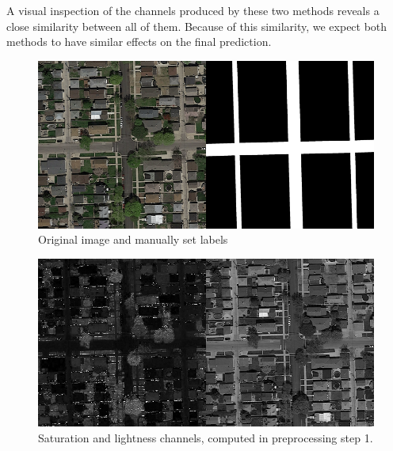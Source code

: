 \documentclass[10pt,conference,compsocconf]{IEEEtran}
\begin{document}
A visual inspection of the channels produced by these two methods reveals a close similarity between all of them.
Because of this similarity, we expect both methods to have similar effects on the final prediction.

\begin{figure}
	\includegraphics[width=\columnwidth]{pictures/original_and_truth}
	\caption{Original image and manually set labels}
	\label{fig:original_and_truth}
\end{figure}
\begin{figure}
	\includegraphics[width=\columnwidth]{pictures/saturation_and_lightness}
	\caption{Saturation and lightness channels, computed in preprocessing step 1.}
	\label{fig:satlit}
\end{figure}
\end{document}
